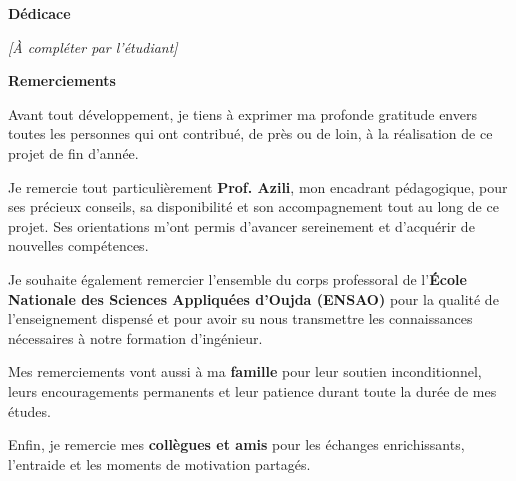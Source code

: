 \documentclass[a4paper,12pt,twoside]{report}
\begin{document}
\newpage
\thispagestyle{empty}
\begin{center}
\Large\textbf{Dédicace}
\end{center}
\vfill
\begin{center}
\textit{[À compléter par l'étudiant]}
\end{center}
\vfill

\newpage
\thispagestyle{empty}
\begin{center}
\Large\textbf{Remerciements}
\end{center}
\vspace{2cm}

Avant tout développement, je tiens à exprimer ma profonde gratitude envers toutes les personnes qui ont contribué, de près ou de loin, à la réalisation de ce projet de fin d'année.

Je remercie tout particulièrement \textbf{Prof. Azili}, mon encadrant pédagogique, pour ses précieux conseils, sa disponibilité et son accompagnement tout au long de ce projet. Ses orientations m'ont permis d'avancer sereinement et d'acquérir de nouvelles compétences.

Je souhaite également remercier l'ensemble du corps professoral de l'\textbf{École Nationale des Sciences Appliquées d'Oujda (ENSAO)} pour la qualité de l'enseignement dispensé et pour avoir su nous transmettre les connaissances nécessaires à notre formation d'ingénieur.

Mes remerciements vont aussi à ma \textbf{famille} pour leur soutien inconditionnel, leurs encouragements permanents et leur patience durant toute la durée de mes études.

Enfin, je remercie mes \textbf{collègues et amis} pour les échanges enrichissants, l'entraide et les moments de motivation partagés.
\end{document}
